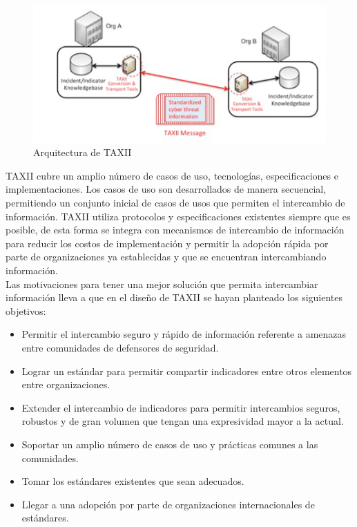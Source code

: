  
\begin{figure}[ht!]
  \centering
    \includegraphics[scale=0.80]{./images/TAXIIArchitecture1.png}
    \caption{Arquitectura de TAXII \protect\cite{b1}}
\end{figure}


TAXII cubre un amplio número de casos de uso, tecnologías, especificaciones e 
implementaciones. Los casos de uso son desarrollados de manera secuencial, 
permitiendo un conjunto inicial de casos de usos que permiten el intercambio de 
información. TAXII utiliza protocolos y especificaciones existentes siempre que 
es posible, de esta forma se integra con mecanismos de intercambio de 
información para reducir los costos de implementación y permitir la adopción 
rápida por parte de organizaciones ya establecidas y que se encuentran 
intercambiando información.\\

Las motivaciones para tener una mejor solución que permita intercambiar 
información lleva a que en el diseño de TAXII se hayan planteado los siguientes 
objetivos:
 \begin{itemize}
   \item Permitir el intercambio seguro y rápido de información referente a 
   amenazas entre comunidades de defensores de seguridad.
   \item Lograr un estándar para permitir compartir indicadores entre otros 
   elementos entre organizaciones.
   \item Extender el intercambio de indicadores para permitir intercambios 
   seguros, robustos y de gran volumen que tengan una expresividad mayor a la 
   actual.
   \item Soportar un amplio número de casos de uso y prácticas comunes a las 
   comunidades.
   \item Tomar los estándares existentes que sean adecuados.
   \item Llegar a una adopción por parte de organizaciones internacionales de 
   estándares.
 \end{itemize}

